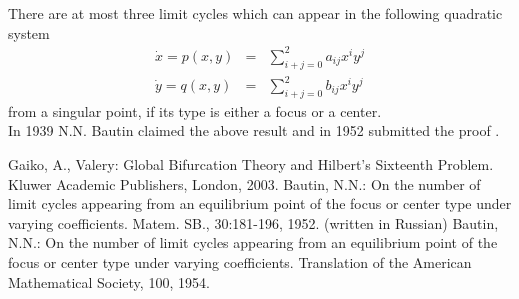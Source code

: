 \documentclass[12pt]{article}
\begin{document}

There are at most three limit cycles which can appear in the following quadratic system
\begin{eqnarray*}
\dot{x} = p(x,y) &=&\sum_{i+j=0}^2 a_{ij}x^iy^j \\
\dot{y} = q(x,y) &=& \sum_{i+j=0}^2 b_{ij}x^iy^j
\end{eqnarray*}
from a singular point, if its type is either a focus or a center.  \\

In 1939 N.N. Bautin claimed the above result and in 1952 submitted the proof \cite{BNN1}. \cite{GAV}
\begin{thebibliography}{1}
 Gaiko, A., Valery: Global Bifurcation Theory and Hilbert's Sixteenth Problem. Kluwer Academic Publishers, London, 2003.
 Bautin, N.N.: On the number of limit cycles appearing from an equilibrium point of the focus or center type under varying coefficients. Matem. SB., 30:181-196, 1952. (written in Russian)
 Bautin, N.N.: On the number of limit cycles appearing from an equilibrium point of the focus or center type under varying coefficients. Translation of the American Mathematical Society, 100, 1954. 
\end{thebibliography}
\end{document}
